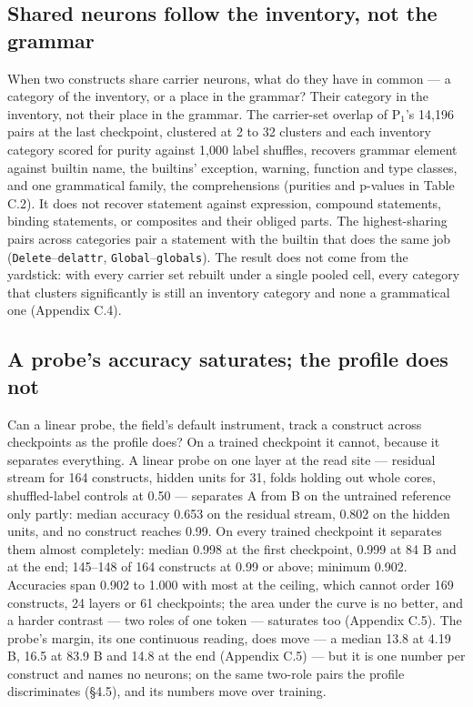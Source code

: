 \documentclass{article}
\begin{document}
\subsection{Shared neurons follow the inventory, not the grammar}

When two constructs share carrier neurons, what do they have in common --- a category of the inventory, or a place in the grammar? Their category in the inventory, not their place in the grammar. The carrier-set overlap of P$_1$'s 14,196 pairs at the last checkpoint, clustered at 2 to 32 clusters and each inventory category scored for purity against 1,000 label shuffles, recovers grammar element against builtin name, the builtins' exception, warning, function and type classes, and one grammatical family, the comprehensions (purities and p-values in Table C.2). It does not recover statement against expression, compound statements, binding statements, or composites and their obliged parts. The highest-sharing pairs across categories pair a statement with the builtin that does the same job (\texttt{Delete}--\texttt{delattr}, \texttt{Global}--\texttt{globals}). The result does not come from the yardstick: with every carrier set rebuilt under a single pooled cell, every category that clusters significantly is still an inventory category and none a grammatical one (Appendix C.4).

\subsection{A probe's accuracy saturates; the profile does not}

Can a linear probe, the field's default instrument, track a construct across checkpoints as the profile does? On a trained checkpoint it cannot, because it separates everything. A linear probe on one layer at the read site --- residual stream for 164 constructs, hidden units for 31, folds holding out whole cores, shuffled-label controls at 0.50 --- separates A from B on the untrained reference only partly: median accuracy 0.653 on the residual stream, 0.802 on the hidden units, and no construct reaches 0.99. On every trained checkpoint it separates them almost completely: median 0.998 at the first checkpoint, 0.999 at 84 B and at the end; 145--148 of 164 constructs at 0.99 or above; minimum 0.902. Accuracies span 0.902 to 1.000 with most at the ceiling, which cannot order 169 constructs, 24 layers or 61 checkpoints; the area under the curve is no better, and a harder contrast --- two roles of one token --- saturates too (Appendix C.5). The probe's margin, its one continuous reading, does move --- a median 13.8 at 4.19 B, 16.5 at 83.9 B and 14.8 at the end (Appendix C.5) --- but it is one number per construct and names no neurons; on the same two-role pairs the profile discriminates (\S4.5), and its numbers move over training.
\end{document}
